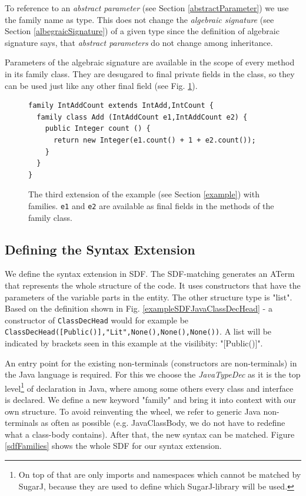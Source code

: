 \documentclass{report}
\begin{document}
\label{familyDependentType}
To reference to an \emph{abstract parameter} (see Section \ref{abstractParameter}) we use the family name as type. This does not change the \emph{algebraic signature} (see Section \ref{albegraicSignature}) of a given type since the definition of algebraic signature says, that \emph{abstract parameters} do not change among inheritance.

Parameters of the algebraic signature are available in the scope of every method in its family class. They are desugared to final private fields in the class, so they can be used just like any other final field (see Fig. \ref{thirdExtensionFamily}).

\begin{figure}[h]
\begin{lstlisting}[language=exprExt]
family IntAddCount extends IntAdd,IntCount {
  family class Add (IntAddCount e1,IntAddCount e2) {
    public Integer count () {
      return new Integer(e1.count() + 1 + e2.count());
    }
  }
}
\end{lstlisting}
\caption{The third extension of the example (see Section \ref{example}) with families. \lstinline{e1} and \lstinline{e2} are available as final fields in the methods of the family class.}
\label{thirdExtensionFamily}
\end{figure}


\subsection{Defining the Syntax Extension}
We define the syntax extension in SDF. The SDF-matching generates an ATerm that represents the whole structure of the code. It uses constructors that have the parameters of the variable parts in the entity. The other structure type is "list". Based on the definition shown in Fig. \ref{exampleSDFJavaClassDecHead} - a constructor of \lstinline{ClassDecHead} would for example be \lstinline[breaklines=false,morekeywords={field1,field2,field3,annot,typeParams,result,methodName,params,throws,body,rest},keywordstyle=\bfseries\color{OliveGreen}]{ClassDecHead([Public()],"Lit",None(),None(),None())}. A list will be indicated by brackets seen in this example at the visilibity: "[Public()]".

An entry point for the existing non-terminals (constructors are non-terminals) in the Java language is required. For this we choose the \emph{JavaTypeDec} as it is the top level\footnote{On top of that are only imports and namespaces which cannot be matched by SugarJ, because they are used to define which SugarJ-library will be used.} of declaration in Java, where among some others every class and interface is declared. We define a new keyword "family" and bring it into context with our own structure. To avoid reinventing the wheel, we refer to generic Java non-terminals as often as possible (e.g. JavaClassBody, we do not have to redefine what a class-body contains). After that, the new syntax can be matched. Figure \ref{sdfFamilies} shows the whole SDF for our syntax extension.
\end{document}
